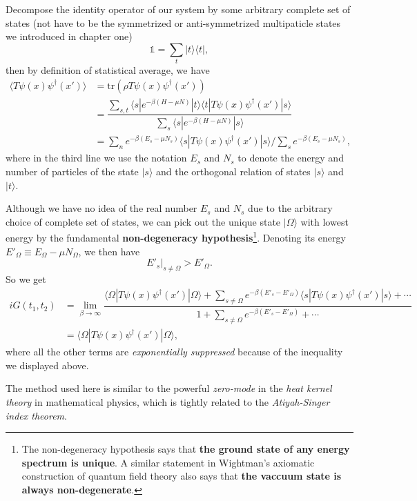 \documentclass[b5paper,10pt,UTF8]{book}
\numberwithin{equation}{section}
\begin{document}
		\begin{Proof}
			Decompose the identity operator of our system by some arbitrary complete set of states (not have to be the symmetrized or anti-symmetrized multipaticle states we introduced in chapter one)
			$$\mathbb{1}=\sum_{t}|t\rangle\langle t|,$$
			then by definition of statistical average, we have
			\begin{align*}
				\langle T\psi(x)\psi^\dagger(x')\rangle&=\mathrm{tr}\left(\rho T\psi(x)\psi^\dagger(x')\right)\\
				&=\dfrac{\displaystyle\sum_{s,t}\langle s|e^{-\beta(H-\mu N)}|t\rangle\langle t|T\psi(x)\psi^\dagger(x')|s\rangle}{\displaystyle\sum_{s}\langle s|e^{-\beta(H-\mu N)}|s\rangle}\\
				&=\displaystyle\sum_{n}e^{-\beta(E_s-\mu N_s)}\langle s|T\psi(x)\psi^\dagger(x')|s\rangle\bigg/\displaystyle\sum_s e^{-\beta(E_s-\mu N_s)},
			\end{align*}
			where in the third line we use the notation $E_s$ and $N_s$ to denote the energy and number of particles of the state $|s\rangle$ and the orthogonal relation of states $|s\rangle$ and $|t\rangle$.\par
			Although we have no idea of the real number $E_s$ and $N_s$ due to the arbitrary choice of complete set of states, we can pick out the unique state $|\Omega\rangle$ with lowest energy by the fundamental \textbf{non-degeneracy hypothesis}\footnote{The non-degeneracy hypothesis says that \textbf{the ground state of any energy spectrum is unique}. A similar statement in Wightman's axiomatic construction of quantum field theory also says that \textbf{the vaccuum state is always non-degenerate}.}. Denoting its energy $E'_{\Omega}\equiv E_\Omega-\mu N_\Omega$, we then have 
			$$E'_s\big|_{s\neq\Omega}>E'_\Omega.$$
			So we get 
			 \begin{align*}
			 	iG(t_1,t_2)&=\lim_{\beta\rightarrow\infty}\dfrac{\displaystyle \langle\Omega|T\psi(x)\psi^\dagger(x')|\Omega\rangle+\sum_{s\neq\Omega}e^{-\beta(E'_s-E'_\Omega)}\langle s|T\psi(x)\psi^\dagger(x')|s\rangle+\cdots}{\displaystyle 1+\sum_{s\neq\Omega}e^{-\beta(E'_s-E'_\Omega)}+\cdots}\\
			 	&=\langle\Omega|T\psi(x)\psi^\dagger(x')|\Omega\rangle,
			 \end{align*}
			 where all the other terms are \emph{exponentially suppressed} because of the inequality we displayed above.
		\end{Proof}
		\begin{Note}
			The method used here is similar to the powerful \emph{zero-mode} in the \emph{heat kernel theory} in mathematical physics, which is tightly related to the \emph{Atiyah-Singer index theorem}.
		\end{Note}
\end{document}
